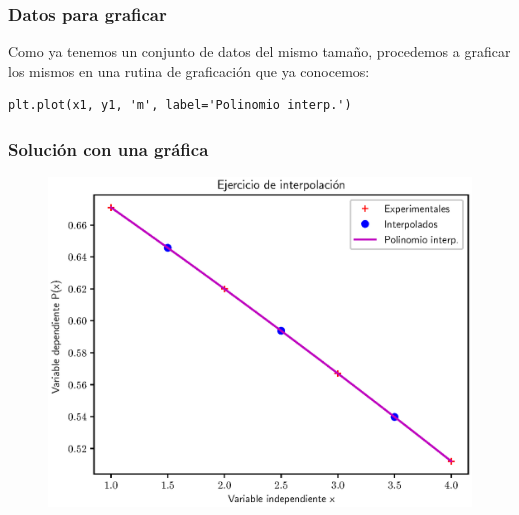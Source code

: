 \documentclass[12pt]{beamer}
\begin{document}
\begin{frame}[fragile]
\frametitle{Datos para graficar}
Como ya tenemos un conjunto de datos del mismo tamaño, procedemos a graficar los mismos en una rutina de graficación que ya conocemos:
\pause
\begin{lstlisting}[caption=Graficando los datos de interpolación]
plt.plot(x1, y1, 'm', label='Polinomio interp.')
\end{lstlisting}
\end{frame}
\begin{frame}
\frametitle{Solución con una gráfica}
\begin{figure}
    \centering
    \includegraphics[scale=0.58]{Imagenes/Ejercicio_Interpolacion_03.eps}
\end{figure}
\end{frame}
\end{document}
